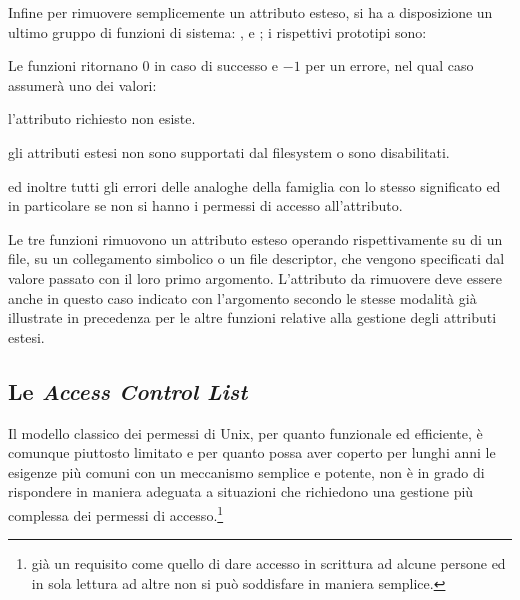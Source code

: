 Infine per rimuovere semplicemente un attributo esteso, si ha a disposizione
un ultimo gruppo di funzioni di sistema: ,
 e ; i rispettivi prototipi sono:

\begin{funcproto}{
}

{Le funzioni ritornano $0$ in caso di successo e $-1$ per un errore, nel qual
  caso  assumerà uno dei valori:
  \begin{errlist}
  \item[\errcode{ENOATTR}] l'attributo richiesto non esiste.
  \item[\errcode{ENOTSUP}] gli attributi estesi non sono supportati dal
    filesystem o sono disabilitati.
  \end{errlist}
  ed inoltre tutti gli errori delle analoghe della famiglia  con lo
  stesso significato ed in particolare  se non si hanno i
  permessi di accesso all'attributo.}
\end{funcproto}

Le tre funzioni rimuovono un attributo esteso operando rispettivamente su di
un file, su un collegamento simbolico o un file descriptor, che vengono
specificati dal valore passato con il loro primo argomento.  L'attributo da
rimuovere deve essere anche in questo caso indicato con
l'argomento  secondo le stesse modalità già illustrate in
precedenza per le altre funzioni relative alla gestione degli attributi
estesi.



\subsection{Le \textit{Access  Control List}}
\label{sec:file_ACL}



Il modello classico dei permessi di Unix, per quanto funzionale ed efficiente,
è comunque piuttosto limitato e per quanto possa aver coperto per lunghi anni
le esigenze più comuni con un meccanismo semplice e potente, non è in grado di
rispondere in maniera adeguata a situazioni che richiedono una gestione più
complessa dei permessi di accesso.\footnote{già un requisito come quello di
  dare accesso in scrittura ad alcune persone ed in sola lettura ad altre non
  si può soddisfare in maniera semplice.}

